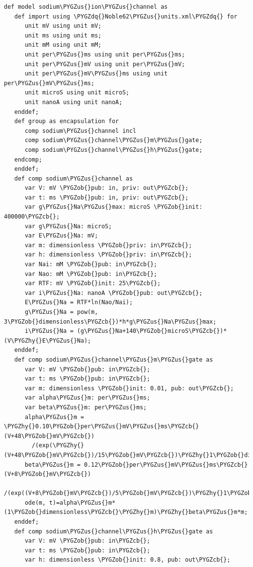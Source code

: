 \documentclass[a4paper,10pt,english]{sphinxmanual}
\def\PYGZus{\char`\_}
\def\PYGZob{\char`\{}
\def\PYGZcb{\char`\}}
\def\PYGZhy{\char`\-}
\def\PYGZdq{\char`\"}
\begin{document}
\begin{Verbatim}[commandchars=\\\{\}]
def model sodium\PYGZus{}ion\PYGZus{}channel as
   def import using \PYGZdq{}Noble62\PYGZus{}units.xml\PYGZdq{} for
      unit mV using unit mV;
      unit ms using unit ms;
      unit mM using unit mM;
      unit per\PYGZus{}ms using unit per\PYGZus{}ms;
      unit per\PYGZus{}mV using unit per\PYGZus{}mV;
      unit per\PYGZus{}mV\PYGZus{}ms using unit per\PYGZus{}mV\PYGZus{}ms;
      unit microS using unit microS;
      unit nanoA using unit nanoA;
   enddef;
   def group as encapsulation for
      comp sodium\PYGZus{}channel incl
      comp sodium\PYGZus{}channel\PYGZus{}m\PYGZus{}gate;
      comp sodium\PYGZus{}channel\PYGZus{}h\PYGZus{}gate;
   endcomp;
   enddef;
   def comp sodium\PYGZus{}channel as
      var V: mV \PYGZob{}pub: in, priv: out\PYGZcb{};
      var t: ms \PYGZob{}pub: in, priv: out\PYGZcb{};
      var g\PYGZus{}Na\PYGZus{}max: microS \PYGZob{}init: 400000\PYGZcb{};
      var g\PYGZus{}Na: microS;
      var E\PYGZus{}Na: mV;
      var m: dimensionless \PYGZob{}priv: in\PYGZcb{};
      var h: dimensionless \PYGZob{}priv: in\PYGZcb{};
      var Nai: mM \PYGZob{}pub: in\PYGZcb{};
      var Nao: mM \PYGZob{}pub: in\PYGZcb{};
      var RTF: mV \PYGZob{}init: 25\PYGZcb{};
      var i\PYGZus{}Na: nanoA \PYGZob{}pub: out\PYGZcb{};
      E\PYGZus{}Na = RTF*ln(Nao/Nai);
      g\PYGZus{}Na = pow(m, 3\PYGZob{}dimensionless\PYGZcb{})*h*g\PYGZus{}Na\PYGZus{}max;
      i\PYGZus{}Na = (g\PYGZus{}Na+140\PYGZob{}microS\PYGZcb{})*(V\PYGZhy{}E\PYGZus{}Na);
   enddef;
   def comp sodium\PYGZus{}channel\PYGZus{}m\PYGZus{}gate as
      var V: mV \PYGZob{}pub: in\PYGZcb{};
      var t: ms \PYGZob{}pub: in\PYGZcb{};
      var m: dimensionless \PYGZob{}init: 0.01, pub: out\PYGZcb{};
      var alpha\PYGZus{}m: per\PYGZus{}ms;
      var beta\PYGZus{}m: per\PYGZus{}ms;
      alpha\PYGZus{}m = \PYGZhy{}0.10\PYGZob{}per\PYGZus{}mV\PYGZus{}ms\PYGZcb{}(V+48\PYGZob{}mV\PYGZcb{})
        /(exp(\PYGZhy{}(V+48\PYGZob{}mV\PYGZcb{})/15\PYGZob{}mV\PYGZcb{})\PYGZhy{}1\PYGZob{}dimensionless\PYGZcb{});
      beta\PYGZus{}m = 0.12\PYGZob{}per\PYGZus{}mV\PYGZus{}ms\PYGZcb{}(V+8\PYGZob{}mV\PYGZcb{})
        /(exp((V+8\PYGZob{}mV\PYGZcb{})/5\PYGZob{}mV\PYGZcb{})\PYGZhy{}1\PYGZob{}dimensionless\PYGZcb{});
      ode(m, t)=alpha\PYGZus{}m*(1\PYGZob{}dimensionless\PYGZcb{}\PYGZhy{}m)\PYGZhy{}beta\PYGZus{}m*m;
   enddef;
   def comp sodium\PYGZus{}channel\PYGZus{}h\PYGZus{}gate as
      var V: mV \PYGZob{}pub: in\PYGZcb{};
      var t: ms \PYGZob{}pub: in\PYGZcb{};
      var h: dimensionless \PYGZob{}init: 0.8, pub: out\PYGZcb{};

\end{Verbatim}
\end{document}
